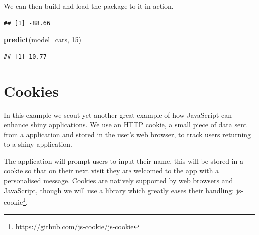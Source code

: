 \documentclass[
]{krantz}
\makeatletter
\newenvironment{Shaded}{\begin{snugshade}}{\end{snugshade}}
\newcommand{\CommentTok}[1]{\textcolor[rgb]{0.37,0.37,0.37}{\textit{#1}}}
\newcommand{\DecValTok}[1]{\textcolor[rgb]{0.06,0.06,0.06}{#1}}
\newcommand{\KeywordTok}[1]{\textcolor[rgb]{0.27,0.27,0.27}{\textbf{#1}}}
\newcommand{\NormalTok}[1]{#1}
\newcommand{\OperatorTok}[1]{\textcolor[rgb]{0.43,0.43,0.43}{\textbf{#1}}}
\newcommand{\StringTok}[1]{\textcolor[rgb]{0.5,0.5,0.5}{#1}}
\renewcommand{\href}[2]{#2\footnote{\url{#1}}}
\newenvironment{kframe}{%
\medskip{}
\setlength{\fboxsep}{.8em}
 \def\at@end@of@kframe{}%
 \ifinner\ifhmode%
  \def\at@end@of@kframe{\end{minipage}}%
  \begin{minipage}{\columnwidth}%
 \fi\fi%
 \def\FrameCommand##1{\hskip\@totalleftmargin \hskip-\fboxsep
 \colorbox{shadecolor}{##1}\hskip-\fboxsep
     \hskip-\linewidth \hskip-\@totalleftmargin \hskip\columnwidth}%
 \MakeFramed {\advance\hsize-\width
   \@totalleftmargin\z@ \linewidth\hsize
   \@setminipage}}%
 {\par\unskip\endMakeFramed%
 \at@end@of@kframe}
\renewenvironment{Shaded}{\begin{kframe}}{\end{kframe}}
\makeatother
\begin{document}
We can then build and load the package to it in action.

\begin{Shaded}
\end{Shaded}

\begin{verbatim}
## [1] -88.66
\end{verbatim}

\begin{Shaded}
\begin{Highlighting}[]
\KeywordTok{predict}\NormalTok{(model\_cars, }\DecValTok{15}\NormalTok{)}
\end{Highlighting}
\end{Shaded}

\begin{verbatim}
## [1] 10.77
\end{verbatim}

\hypertarget{cookies}{%
\chapter{Cookies}\label{cookies}}

In this example we scout yet another great example of how JavaScript can enhance shiny applications. We use an HTTP cookie, a small piece of data sent from a application and stored in the user's web browser, to track users returning to a shiny application.

The application will prompt users to input their name, this will be stored in a cookie so that on their next visit they are welcomed to the app with a personalised message. Cookies are natively supported by web browsers and JavaScript, though we will use a library which greatly eases their handling: \href{https://github.com/js-cookie/js-cookie}{js-cookie}.
\end{document}
